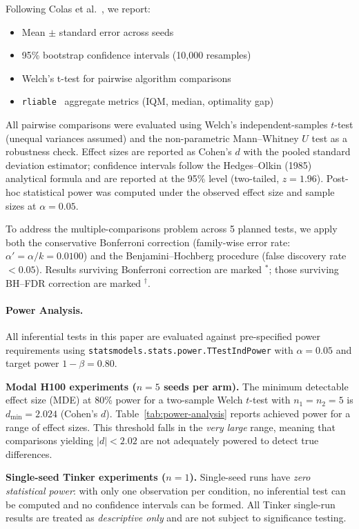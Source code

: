 \documentclass{article}
\begin{document}
Following Colas et al.~\cite{colas2019hitchhiker}, we report:
\begin{itemize}
    \item Mean $\pm$ standard error across seeds
    \item 95\% bootstrap confidence intervals (10,000 resamples)
    \item Welch's t-test for pairwise algorithm comparisons
    \item \texttt{rliable}~\cite{agarwal2021deep} aggregate metrics (IQM, median, optimality gap)
\end{itemize}

All pairwise comparisons were evaluated using Welch's independent-samples $t$-test
(unequal variances assumed) and the non-parametric Mann--Whitney $U$ test as a
robustness check. Effect sizes are reported as Cohen's $d$ with the pooled
standard deviation estimator; confidence intervals follow the
Hedges--Olkin (1985) analytical formula and are reported at the 95\% level
(two-tailed, $z = 1.96$). Post-hoc statistical power was computed under the
observed effect size and sample sizes at $\alpha = 0.05$.

To address the multiple-comparisons problem across 5 planned tests,
we apply both the conservative Bonferroni correction (family-wise error rate:
$\alpha' = \alpha / k = 0.0100$) and the Benjamini--Hochberg procedure
(false discovery rate $< 0.05$). Results surviving Bonferroni correction are
marked $^*$; those surviving BH--FDR correction are marked $^\dag$.

\paragraph{Power Analysis.}
All inferential tests in this paper are evaluated against pre-specified power
requirements using \texttt{statsmodels.stats.power.TTestIndPower} with
$\alpha = 0.05$ and target power $1 - \beta = 0.80$.

\textbf{Modal H100 experiments ($n = 5$ seeds per arm).}
The minimum detectable effect size (MDE) at 80\% power for a two-sample
Welch $t$-test with $n_1 = n_2 = 5$ is
$d_{\min} = 2.024$ (Cohen's $d$).
Table~\ref{tab:power-analysis} reports achieved power for a range of effect sizes.
This threshold falls in the \emph{very large} range, meaning that
comparisons yielding $|d| < 2.02$
are not adequately powered to detect true differences.

\textbf{Single-seed Tinker experiments ($n = 1$).}
Single-seed runs have \emph{zero statistical power}: with only one observation per
condition, no inferential test can be computed and no confidence intervals can be
formed.  All Tinker single-run results are treated as \emph{descriptive only} and
are not subject to significance testing.
\end{document}
